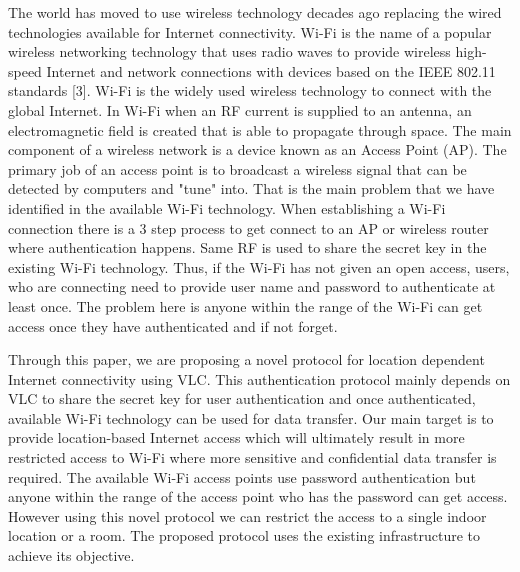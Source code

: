 The world has moved to use wireless technology decades ago replacing the wired technologies available for Internet connectivity. Wi-Fi is the name of a popular wireless networking technology that uses radio waves to provide wireless high-speed Internet and network connections with devices based on the IEEE 802.11 standards [3]. Wi-Fi is the widely used wireless technology to connect with the global Internet. In Wi-Fi when an RF current is supplied to an antenna, an electromagnetic field is created that is able to propagate through space. The main component of a wireless network is a device known as an Access Point (AP). The primary job of an access point is to broadcast a wireless signal that can be detected by computers and "tune" into. That is the main problem that we have identified in the available Wi-Fi technology. When establishing a Wi-Fi connection there is a 3 step process to get connect to an AP or wireless router where authentication happens. Same RF is used to share the secret key in the existing Wi-Fi technology.  Thus, if the Wi-Fi has not given an open access, users, who are connecting need to provide user name and password to authenticate at least once.  The problem here is anyone within the range of the Wi-Fi can get access once they have authenticated and if not forget.

Through this paper, we are proposing a novel protocol for location dependent Internet connectivity using VLC. This authentication protocol mainly depends on VLC to share the secret key for user authentication and once authenticated, available Wi-Fi technology can be used for data transfer. Our main target is to provide location-based Internet access which will ultimately result in more restricted access to Wi-Fi where more sensitive and confidential data transfer is required. The available Wi-Fi access points use password authentication but anyone within the range of the access point who has the password can get access. However using this novel protocol we can restrict the access to a single indoor location or a room. The proposed protocol uses the existing infrastructure to achieve its objective.
